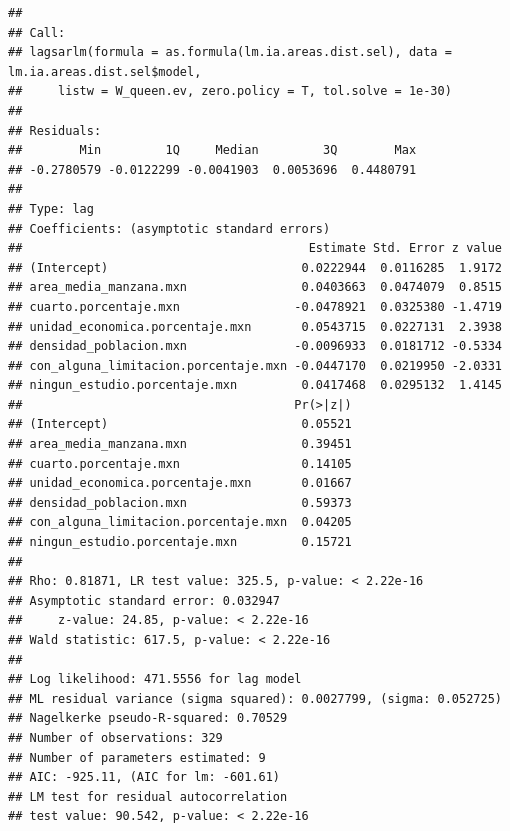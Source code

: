 \documentclass[12pt,]{book}
\newenvironment{Shaded}{\begin{snugshade}}{\end{snugshade}}
\newcommand{\KeywordTok}[1]{\textcolor[rgb]{0.13,0.29,0.53}{\textbf{#1}}}
\newcommand{\DataTypeTok}[1]{\textcolor[rgb]{0.13,0.29,0.53}{#1}}
\newcommand{\FloatTok}[1]{\textcolor[rgb]{0.00,0.00,0.81}{#1}}
\newcommand{\CommentTok}[1]{\textcolor[rgb]{0.56,0.35,0.01}{\textit{#1}}}
\newcommand{\OperatorTok}[1]{\textcolor[rgb]{0.81,0.36,0.00}{\textbf{#1}}}
\newcommand{\NormalTok}[1]{#1}
\begin{document}
\begin{verbatim}
## 
## Call:
## lagsarlm(formula = as.formula(lm.ia.areas.dist.sel), data = lm.ia.areas.dist.sel$model, 
##     listw = W_queen.ev, zero.policy = T, tol.solve = 1e-30)
## 
## Residuals:
##        Min         1Q     Median         3Q        Max 
## -0.2780579 -0.0122299 -0.0041903  0.0053696  0.4480791 
## 
## Type: lag 
## Coefficients: (asymptotic standard errors) 
##                                        Estimate Std. Error z value
## (Intercept)                           0.0222944  0.0116285  1.9172
## area_media_manzana.mxn                0.0403663  0.0474079  0.8515
## cuarto.porcentaje.mxn                -0.0478921  0.0325380 -1.4719
## unidad_economica.porcentaje.mxn       0.0543715  0.0227131  2.3938
## densidad_poblacion.mxn               -0.0096933  0.0181712 -0.5334
## con_alguna_limitacion.porcentaje.mxn -0.0447170  0.0219950 -2.0331
## ningun_estudio.porcentaje.mxn         0.0417468  0.0295132  1.4145
##                                      Pr(>|z|)
## (Intercept)                           0.05521
## area_media_manzana.mxn                0.39451
## cuarto.porcentaje.mxn                 0.14105
## unidad_economica.porcentaje.mxn       0.01667
## densidad_poblacion.mxn                0.59373
## con_alguna_limitacion.porcentaje.mxn  0.04205
## ningun_estudio.porcentaje.mxn         0.15721
## 
## Rho: 0.81871, LR test value: 325.5, p-value: < 2.22e-16
## Asymptotic standard error: 0.032947
##     z-value: 24.85, p-value: < 2.22e-16
## Wald statistic: 617.5, p-value: < 2.22e-16
## 
## Log likelihood: 471.5556 for lag model
## ML residual variance (sigma squared): 0.0027799, (sigma: 0.052725)
## Nagelkerke pseudo-R-squared: 0.70529 
## Number of observations: 329 
## Number of parameters estimated: 9 
## AIC: -925.11, (AIC for lm: -601.61)
## LM test for residual autocorrelation
## test value: 90.542, p-value: < 2.22e-16
\end{verbatim}

\begin{Shaded}
\end{Shaded}
\end{document}
